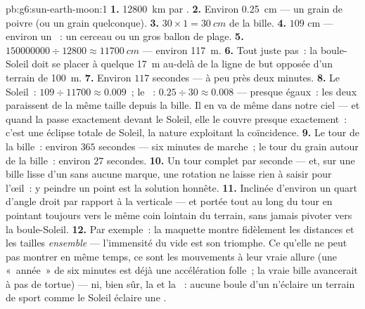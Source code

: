 \begin{solution}{pb:g6:sun-earth-moon:1}
\textbf{1.} \qty{12800}{km} par .
\textbf{2.} Environ \qty{0.25}{cm} --- un grain de poivre (ou un
grain quelconque).
\textbf{3.} $30 \times 1 = \qty{30}{cm}$ de la bille.
\textbf{4.} $109$ cm --- environ un ~: un cerceau ou un gros
ballon de plage.
\textbf{5.} $150000000 \div 12800 \approx \qty{11700}{cm}$ ---
environ \qty{117}{m}.
\textbf{6.} Tout juste pas~: la boule-Soleil doit se placer à quelque
\qty{17}{m} au-delà de la ligne de but opposée d'un terrain de
\qty{100}{m}.
\textbf{7.} Environ $117$ secondes --- à peu près deux minutes.
\textbf{8.} Le Soleil~: $109 \div 11700 \approx 0.009$~; le
~: $0.25 \div 30 \approx 0.008$ --- presque égaux~: les
deux paraissent de la même taille depuis la bille. Il en va de même
dans notre ciel --- et quand la  passe exactement devant le
Soleil, elle le couvre presque exactement~: c'est une éclipse totale
de Soleil, la nature exploitant la coïncidence.
\textbf{9.} Le tour de la bille~: environ $365$ secondes --- six
minutes de marche~; le tour du grain autour de la bille~: environ
$27$ secondes.
\textbf{10.} Un tour complet par seconde --- et, sur une bille lisse
d'un  sans aucune marque, une rotation ne laisse rien à
saisir pour l'œil~: y peindre un point est la solution honnête.
\textbf{11.} Inclinée d'environ un quart d'angle droit par rapport à
la verticale --- et portée tout au long du tour en pointant toujours
vers le même coin lointain du terrain, sans jamais pivoter vers la
boule-Soleil.
\textbf{12.} Par exemple~: la maquette montre fidèlement les
distances et les tailles \emph{ensemble} --- l'immensité du vide est
son triomphe. Ce qu'elle ne peut pas montrer en même temps, ce sont
les mouvements à leur vraie allure (une «~année~» de six minutes est
déjà une accélération folle~; la vraie bille avancerait à pas de
tortue) --- ni, bien sûr, la  et la ~: aucune boule
d'un  n'éclaire un terrain de sport comme le Soleil éclaire une
.
\end{solution}
